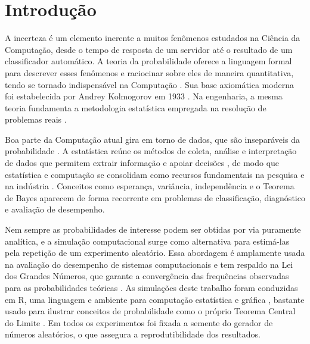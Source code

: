 \section{Introdução}

A incerteza é um elemento inerente a muitos fenômenos estudados na Ciência da
Computação, desde o tempo de resposta de um servidor até o resultado de um
classificador automático. A teoria da probabilidade oferece a linguagem formal
para descrever esses fenômenos e raciocinar sobre eles de maneira quantitativa,
tendo se tornado indispensável na Computação \cite{harcholbalter2024probability}.
Sua base axiomática moderna foi estabelecida por Andrey Kolmogorov em 1933
\cite{kolmogorov1933grundbegriffe}. Na engenharia, a mesma teoria fundamenta a
metodologia estatística empregada na resolução de problemas reais
\cite{montgomery2018applied}.

Boa parte da Computação atual gira em torno de dados, que são inseparáveis da
probabilidade \cite{chan2021probability}. A estatística reúne os métodos de coleta,
análise e interpretação de dados que permitem extrair informação e apoiar decisões
\cite{sahu2024probability}, de modo que estatística e computação se consolidam como
recursos fundamentais na pesquisa e na indústria \cite{ferreira2020estatistica}.
Conceitos como esperança, variância, independência e o Teorema de Bayes aparecem de
forma recorrente em problemas de classificação, diagnóstico e avaliação de
desempenho.

Nem sempre as probabilidades de interesse podem ser obtidas por via puramente
analítica, e a simulação computacional surge como alternativa para estimá-las pela
repetição de um experimento aleatório. Essa abordagem é amplamente usada na
avaliação do desempenho de sistemas computacionais
\cite{harcholbalter2024probability} e tem respaldo na Lei dos Grandes Números, que
garante a convergência das frequências observadas para as probabilidades teóricas
\cite{ross2010probabilidade}. As simulações deste trabalho foram conduzidas em R,
uma linguagem e ambiente para computação estatística e gráfica
\cite{ferreira2020estatistica}, bastante usado para ilustrar conceitos de
probabilidade como o próprio Teorema Central do Limite \cite{sahu2024probability}.
Em todos os experimentos foi fixada a semente do gerador de números aleatórios, o
que assegura a reprodutibilidade dos resultados.

